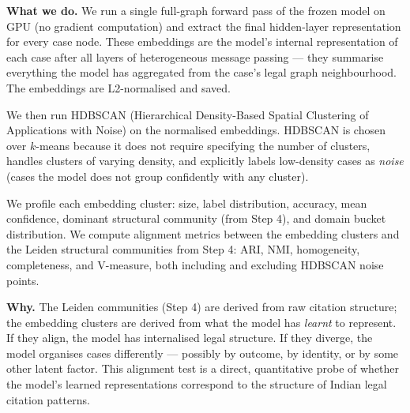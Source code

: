 \documentclass[11pt,a4paper]{article}
\begin{document}
\textbf{What we do.}
We run a single full-graph forward pass of the frozen model on GPU (no gradient
computation) and extract the final hidden-layer representation for every case node.
These embeddings are the model's internal representation of each case after all layers
of heterogeneous message passing --- they summarise everything the model has aggregated
from the case's legal graph neighbourhood. The embeddings are L2-normalised and saved.

We then run HDBSCAN (Hierarchical Density-Based Spatial Clustering of Applications
with Noise) on the normalised embeddings. HDBSCAN is chosen over $k$-means because it
does not require specifying the number of clusters, handles clusters of varying density,
and explicitly labels low-density cases as \emph{noise} (cases the model does not
group confidently with any cluster).

We profile each embedding cluster: size, label distribution, accuracy, mean confidence,
dominant structural community (from Step 4), and domain bucket distribution. We compute
alignment metrics between the embedding clusters and the Leiden structural communities
from Step 4: ARI, NMI, homogeneity, completeness, and V-measure, both including and
excluding HDBSCAN noise points.

\textbf{Why.}
The Leiden communities (Step 4) are derived from raw citation structure; the embedding
clusters are derived from what the model has \emph{learnt} to represent. If they align,
the model has internalised legal structure. If they diverge, the model organises cases
differently --- possibly by outcome, by identity, or by some other latent factor. This
alignment test is a direct, quantitative probe of whether the model's learned
representations correspond to the structure of Indian legal citation patterns.
\end{document}
